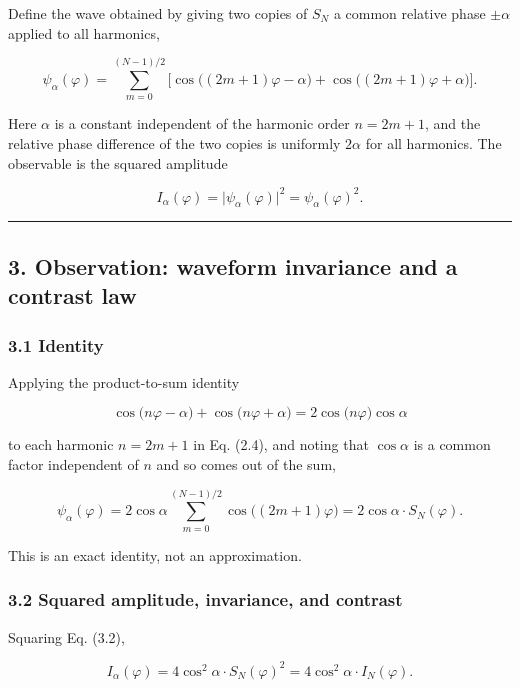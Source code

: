 \documentclass[
]{ltjsarticle}
\begin{document}
Define the wave obtained by giving two copies of \(S_N\) a common
relative phase \(\pm\alpha\) applied to all harmonics,

\[
\psi_\alpha(\varphi)
=\sum_{m=0}^{(N-1)/2}\Big[\cos\!\big((2m+1)\varphi-\alpha\big)+\cos\!\big((2m+1)\varphi+\alpha\big)\Big].
\tag{2.4}
\]

Here \(\alpha\) is a constant independent of the harmonic order
\(n=2m+1\), and the relative phase difference of the two copies is
uniformly \(2\alpha\) for all harmonics. The observable is the squared
amplitude

\[
I_\alpha(\varphi)=\big|\psi_\alpha(\varphi)\big|^2=\psi_\alpha(\varphi)^2.
\tag{2.5}
\]

\begin{center}\rule{0.5\linewidth}{0.5pt}\end{center}

\subsection{3. Observation: waveform invariance and a contrast
law}\label{observation-waveform-invariance-and-a-contrast-law}

\subsubsection{3.1 Identity}\label{identity}

Applying the product-to-sum identity

\[
\cos\!\big(n\varphi-\alpha\big)+\cos\!\big(n\varphi+\alpha\big)=2\cos\!\big(n\varphi\big)\cos\alpha
\tag{3.1}
\]

to each harmonic \(n=2m+1\) in Eq. (2.4), and noting that \(\cos\alpha\)
is a common factor independent of \(n\) and so comes out of the sum,

\[
\psi_\alpha(\varphi)
=2\cos\alpha\sum_{m=0}^{(N-1)/2}\cos\!\big((2m+1)\varphi\big)
=2\cos\alpha\cdot S_N(\varphi).
\tag{3.2}
\]

This is an exact identity, not an approximation.

\subsubsection{3.2 Squared amplitude, invariance, and
contrast}\label{squared-amplitude-invariance-and-contrast}

Squaring Eq. (3.2),

\[
I_\alpha(\varphi)=4\cos^2\!\alpha\cdot S_N(\varphi)^2=4\cos^2\!\alpha\cdot I_N(\varphi).
\tag{3.3}
\]
\end{document}
